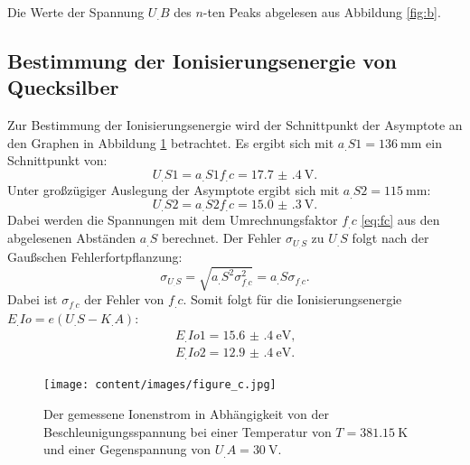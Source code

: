 \begin{table}
\centering
\caption{Die Werte der Spannung $U_.B$ des $n$-ten Peaks abgelesen aus Abbildung \ref{fig:b}.}

\label{tab:FranckHertz}
\end{table}

\subsection{Bestimmung der Ionisierungsenergie von Quecksilber}

Zur Bestimmung der Ionisierungsenergie wird der Schnittpunkt der Asymptote an den Graphen in Abbildung \ref{fig:c} betrachtet.
Es ergibt sich mit $a_.{S1} = \SI{136}{\milli\metre}$ ein Schnittpunkt von:
\[
U_.{S1} = a_.{S1}f_.c = \SI{17.7(4)}{\volt}\text{.}
\]
Unter großzügiger Auslegung der Asymptote ergibt sich mit $a_.{S2} = \SI{115}{\milli\metre}$:
\[
U_.{S2} = a_.{S2}f_.c = \SI{15.0(3)}{\volt}\text{.}
\]
Dabei werden die Spannungen mit dem Umrechnungsfaktor $f_.c$ \eqref{eq:fc} aus den abgelesenen Abständen $a_.S$ berechnet. Der Fehler $\sigma_{U_.S}$ zu $U_.S$ folgt nach der Gaußschen Fehlerfortpflanzung:
\[
\sigma_{U_.S} = \sqrt{a_.S^2\sigma_{f_.{c}}^2} = a_.S\sigma_{f_.{c}}\text{.}
\]
Dabei ist $\sigma_{f_.{c}}$ der Fehler von $f_.{c}$.
Somit folgt für die Ionisierungsenergie $E_.{Io} = e(U_.S-K_.A)$:
\begin{align*}
E_.{Io1} = \SI{15.6(4)}{\electronvolt}\text{,}\\
E_.{Io2} = \SI{12.9(4)}{\electronvolt}\text{.}
\end{align*}

\begin{figure}
\centering
\texttt{[image: content/images/figure\_c.jpg]}
\caption{Der gemessene Ionenstrom in Abhängigkeit von der Beschleunigungsspannung bei einer Temperatur von $T=\SI{381,15}{\kelvin}$ und einer Gegenspannung von $U_.A=\SI{30}{\volt}$.}
\label{fig:c}
\end{figure}